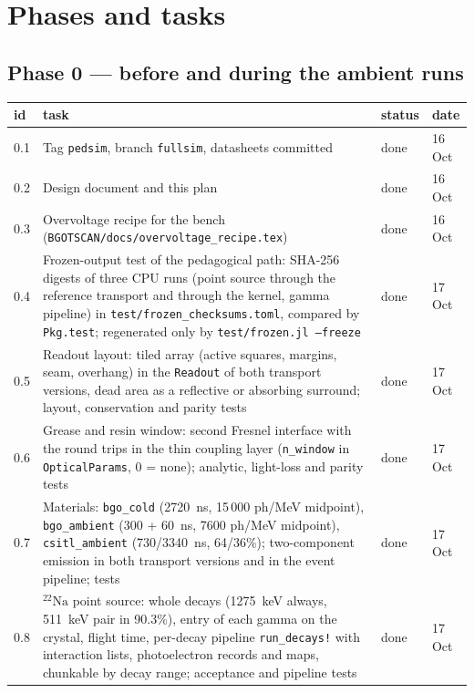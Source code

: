 \documentclass[11pt]{article}
\newcommand{\code}[1]{\texttt{#1}}
\newcommand{\Na}{\ensuremath{{}^{22}\mathrm{Na}}\xspace}
\newcommand{\done}{done}
\begin{document}
\section{Phases and tasks}

\subsection*{Phase 0 --- before and during the ambient runs}

\begin{longtable}{p{} p{} p{} p{}}
\toprule
id & task & status & date \\
\midrule
\endhead
0.1 & Tag \code{pedsim}, branch \code{fullsim}, datasheets committed & \done & 16 Oct \\
0.2 & Design document and this plan & \done & 16 Oct \\
0.3 & Overvoltage recipe for the bench (\code{BGOTSCAN/docs/overvoltage\_recipe.tex}) & \done & 16 Oct \\
0.4 & Frozen-output test of the pedagogical path: SHA-256 digests of three CPU runs (point source through the reference transport and through the kernel, gamma pipeline) in \code{test/frozen\_checksums.toml}, compared by \code{Pkg.test}; regenerated only by \code{test/frozen.jl --freeze} & \done & 17 Oct \\
0.5 & Readout layout: tiled array (active squares, margins, seam, overhang) in the \code{Readout} of both transport versions, dead area as a reflective or absorbing surround; layout, conservation and parity tests & \done & 17 Oct \\
0.6 & Grease and resin window: second Fresnel interface with the round trips in the thin coupling layer (\code{n\_window} in \code{OpticalParams}, 0 = none); analytic, light-loss and parity tests & \done & 17 Oct \\
0.7 & Materials: \code{bgo\_cold} (2720~ns, 15\,000 ph/MeV midpoint), \code{bgo\_ambient} (300 + 60~ns, 7600 ph/MeV midpoint), \code{csitl\_ambient} (730/3340~ns, 64/36\%); two-component emission in both transport versions and in the event pipeline; tests & \done & 17 Oct \\
0.8 & \Na point source: whole decays (1275~keV always, 511~keV pair in 90.3\%), entry of each gamma on the crystal, flight time, per-decay pipeline \code{run\_decays!} with interaction lists, photoelectron records and maps, chunkable by decay range; acceptance and pipeline tests & \done & 17 Oct \\

\end{longtable}
\end{document}
